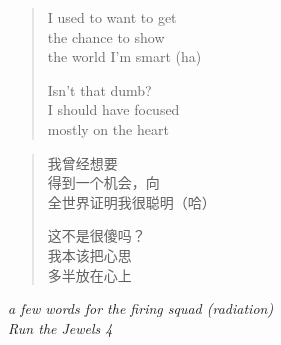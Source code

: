 \clearpage\thispagestyle{empty}\vspace*{\fill}

\begin{verse}
I used to want to get \\
the chance to show \\
the world I'm smart (ha)

Isn't that dumb? \\
I should have focused \\
mostly on the heart
\end{verse}
\begin{verse}\small
我曾经想要 \\
得到一个机会，向 \\
全世界证明我很聪明（哈）

这不是很傻吗？ \\
我本该把心思 \\
多半放在心上
\end{verse}
\begin{flushright}\small\itshape
a few words for the firing squad (radiation) \\
Run the Jewels 4
\end{flushright}

\vspace*{\fill}\clearpage
